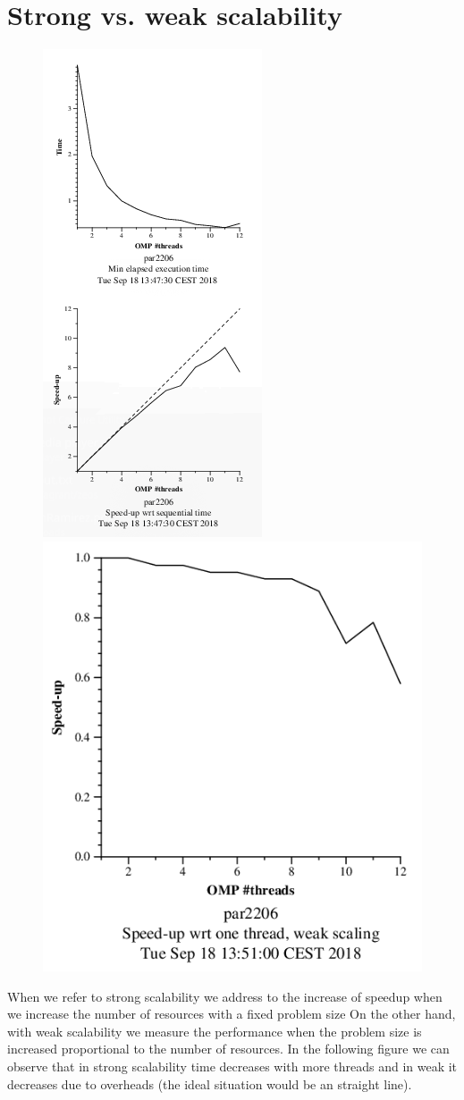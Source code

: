 \documentclass{article}
\begin{document}
\section*{Strong vs. weak scalability}
\begin{figure}
\includegraphics[width=0.45\linewidth, height=0.6\linewidth]{strongPI.png}
\includegraphics[width=0.45\linewidth, height=0.6\linewidth]{weakPI.png}
\end{figure}

When we refer to strong scalability we address to the increase of speedup when we increase the number of resources with a fixed problem size\newline
On the other hand, with weak scalability we measure the performance when the problem size is increased proportional to the number of resources.\newline
In the following figure we can observe that in strong scalability time decreases with more threads and in weak it decreases due to overheads (the ideal situation would be an straight line).\newline \newline \newline
\end{document}
